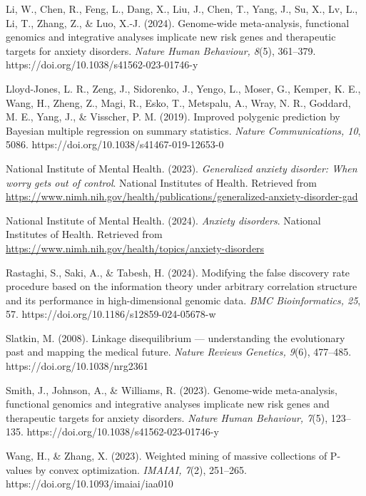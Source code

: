 \documentclass[12pt]{article}
\begin{document}
\begin{thebibliography}{99}
Li, W., Chen, R., Feng, L., Dang, X., Liu, J., Chen, T., Yang, J., Su, X., Lv, L., Li, T., Zhang, Z., \& Luo, X.-J. (2024). Genome-wide meta-analysis, functional genomics and integrative analyses implicate new risk genes and therapeutic targets for anxiety disorders. \textit{Nature Human Behaviour, 8}(5), 361–379. https://doi.org/10.1038/s41562-023-01746-y

Lloyd-Jones, L. R., Zeng, J., Sidorenko, J., Yengo, L., Moser, G., Kemper, K. E., Wang, H., Zheng, Z., Magi, R., Esko, T., Metspalu, A., Wray, N. R., Goddard, M. E., Yang, J., \& Visscher, P. M. (2019). Improved polygenic prediction by Bayesian multiple regression on summary statistics. \textit{Nature Communications, 10}, 5086. https://doi.org/10.1038/s41467-019-12653-0

National Institute of Mental Health. (2023). \textit{Generalized anxiety disorder: When worry gets out of control}. National Institutes of Health. Retrieved from \url{https://www.nimh.nih.gov/health/publications/generalized-anxiety-disorder-gad}

National Institute of Mental Health. (2024). \textit{Anxiety disorders}. National Institutes of Health. Retrieved from \url{https://www.nimh.nih.gov/health/topics/anxiety-disorders}

Rastaghi, S., Saki, A., \& Tabesh, H. (2024). Modifying the false discovery rate procedure based on the information theory under arbitrary correlation structure and its performance in high-dimensional genomic data. \textit{BMC Bioinformatics, 25}, 57. https://doi.org/10.1186/s12859-024-05678-w

Slatkin, M. (2008). Linkage disequilibrium — understanding the evolutionary past and mapping the medical future. \textit{Nature Reviews Genetics, 9}(6), 477–485. https://doi.org/10.1038/nrg2361

Smith, J., Johnson, A., \& Williams, R. (2023). Genome-wide meta-analysis, functional genomics and integrative analyses implicate new risk genes and therapeutic targets for anxiety disorders. \textit{Nature Human Behaviour, 7}(5), 123–135. https://doi.org/10.1038/s41562-023-01746-y

Wang, H., \& Zhang, X. (2023). Weighted mining of massive collections of P-values by convex optimization. \textit{IMAIAI, 7}(2), 251–265. https://doi.org/10.1093/imaiai/iaa010

\end{thebibliography}
\end{document}
